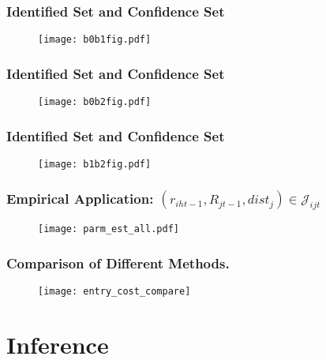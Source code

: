 \begin{frame}
\frametitle{Identified Set and Confidence Set}

\begin{figure}
\centering
\texttt{[image: b0b1fig.pdf]}
\end{figure}
\end{frame}
\begin{frame}
\frametitle{Identified Set and Confidence Set}

\begin{figure}
\centering
\texttt{[image: b0b2fig.pdf]}
\end{figure}
\end{frame}
\begin{frame}
\frametitle{Identified Set and Confidence Set}

\begin{figure}
\centering
\texttt{[image: b1b2fig.pdf]}
\end{figure}
\end{frame}
\begin{frame}
\frametitle{Empirical Application: $(r_{iht-1},R_{jt-1},dist_{j})\in\mathcal{J}_{ijt}$}

\begin{figure}[h]
\centering\texttt{[image: parm\_est\_all.pdf]}
\end{figure}

\end{frame}

\begin{frame}
\frametitle{Comparison of Different Methods.}

\begin{figure}[h]
\centering\texttt{[image: entry\_cost\_compare]}
\end{figure}

\end{frame}



\section{Inference}

